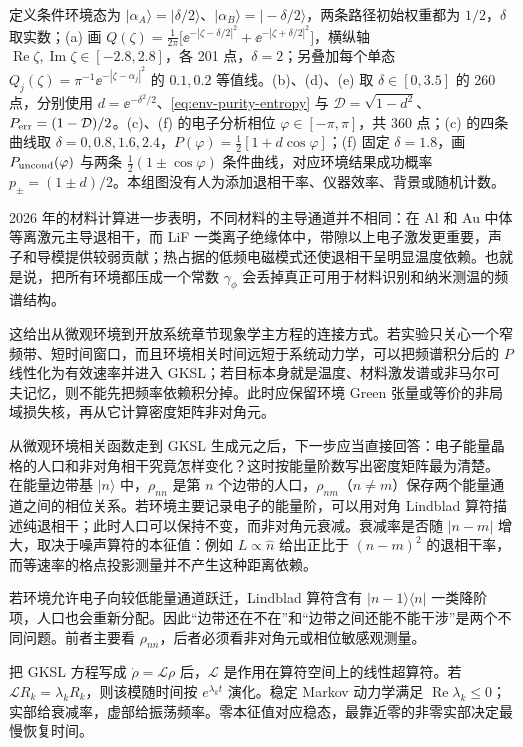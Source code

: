 定义条件环境态为 $|\alpha_A\rangle=|\delta/2\rangle$、$|\alpha_B\rangle=|-\delta/2\rangle$，两条路径初始权重都为 $1/2$，$\delta$ 取实数；(a) 画 $Q(\zeta)=\tfrac1{2\pi}\bigl[\ee^{-|\zeta-\delta/2|^2}+\ee^{-|\zeta+\delta/2|^2}\bigr]$，横纵轴 $\operatorname{Re}\zeta,\operatorname{Im}\zeta\in[-2.8,2.8]$，各 201 点，$\delta=2$；另叠加每个单态 $Q_j(\zeta)=\pi^{-1}\ee^{-|\zeta-\alpha_j|^2}$ 的 $0.1,0.2$ 等值线。(b)、(d)、(e) 取 $\delta\in[0,3.5]$ 的 260 点，分别使用 $d=\ee^{-\delta^2/2}$、\cref{eq:env-purity-entropy} 与 $\mathcal D=\sqrt{1-d^2}$、$P_{\rm err}=(1-\mathcal D)/2$。(c)、(f) 的电子分析相位 $\varphi\in[-\pi,\pi]$，共 360 点；(c) 的四条曲线取 $\delta=0,0.8,1.6,2.4$，$P(\varphi)=\tfrac12[1+d\cos\varphi]$；(f) 固定 $\delta=1.8$，画 $P_{\rm uncond}(\varphi)$ 与两条 $\tfrac12(1\pm\cos\varphi)$ 条件曲线，对应环境结果成功概率 $p_\pm=(1\pm d)/2$。本组图没有人为添加退相干率、仪器效率、背景或随机计数。


2026 年的材料计算进一步表明，不同材料的主导通道并不相同：在 Al 和 Au 中体等离激元主导退相干，而 LiF 一类离子绝缘体中，带隙以上电子激发更重要，声子和导模提供较弱贡献；热占据的低频电磁模式还使退相干呈明显温度依赖。也就是说，把所有环境都压成一个常数 $\gamma_\phi$ 会丢掉真正可用于材料识别和纳米测温的频谱结构。

这给出从微观环境到开放系统章节现象学主方程的连接方式。若实验只关心一个窄频带、短时间窗口，而且环境相关时间远短于系统动力学，可以把频谱积分后的 $P$ 线性化为有效速率并进入 GKSL；若目标本身就是温度、材料激发谱或非马尔可夫记忆，则不能先把频率依赖积分掉。此时应保留环境 Green 张量或等价的非局域损失核，再从它计算密度矩阵非对角元。

从微观环境相关函数走到 GKSL 生成元之后，下一步应当直接回答：电子能量晶格的人口和非对角相干究竟怎样变化？这时按能量阶数写出密度矩阵最为清楚。
在能量边带基 $|n\rangle$ 中，$\rho_{nn}$ 是第 $n$ 个边带的人口，$\rho_{nm}$（$n\ne m$）保存两个能量通道之间的相位关系。若环境主要记录电子的能量阶，可以用对角 Lindblad 算符描述纯退相干；此时人口可以保持不变，而非对角元衰减。衰减率是否随 $|n-m|$ 增大，取决于噪声算符的本征值：例如 $L\propto\hat n$ 给出正比于 $(n-m)^2$ 的退相干率，而等速率的格点投影测量并不产生这种距离依赖。

若环境允许电子向较低能量通道跃迁，Lindblad 算符含有 $|n-1\rangle\langle n|$ 一类降阶项，人口也会重新分配。因此“边带还在不在”和“边带之间还能不能干涉”是两个不同问题。前者主要看 $\rho_{nn}$，后者必须看非对角元或相位敏感观测量。

把 GKSL 方程写成 $\dot\rho=\mathcal L\rho$ 后，$\mathcal L$ 是作用在算符空间上的线性超算符。若 $\mathcal L R_k=\lambda_kR_k$，则该模随时间按 $e^{\lambda_k t}$ 演化。稳定 Markov 动力学满足 $\operatorname{Re}\lambda_k\le0$；实部给衰减率，虚部给振荡频率。零本征值对应稳态，最靠近零的非零实部决定最慢恢复时间。

